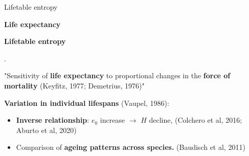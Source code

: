 \documentclass[10pt]{beamer}
\begin{document}
\begin{frame}{Lifetable entropy}
	
	\textbf{Life expectancy}
	\begin{center}\nonumber
		 \pause
	\end{center} 


	\textbf{Lifetable entropy}
	
	\begin{center}\label{eq:EntropyGeneral}
	. \pause
	\end{center}
	
	\begin{center}
	"Sensitivity of \textbf{life expectancy} to proportional changes in the \textbf{force of mortality} {\scriptsize (Keyfitz, 1977; Demetrius, 1976)}" \pause
	\end{center}

	
	
	
\textbf{Variation in individual lifespans} {\scriptsize (Vaupel, 1986)}: \pause
\begin{itemize}
	\item \textbf{Inverse relationship}: $e_0$ increase $\rightarrow$ $H$ decline, {\scriptsize (Colchero et al, 2016; Aburto et al, 2020)} \pause
	\item Comparison of \textbf{ageing patterns across species.} {\scriptsize (Baudisch et al, 2011)}
\end{itemize}
	
\end{frame}
\end{document}

